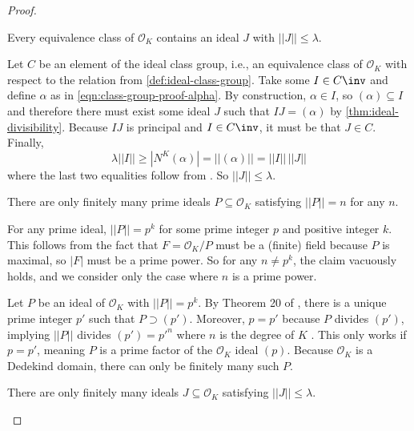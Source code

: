 \begin{proof}
    \medskip

    \begin{lemma}
        Every equivalence class of $\mathcal O_K$ contains an ideal $J$ with $||J|| \leq \lambda$.
    \end{lemma}

    Let $C$ be an element of the ideal class group, i.e., an equivalence class of $\mathcal O_K$ with respect to the relation from \autoref{def:ideal-class-group}. Take some $I \in C \inv$ and define $\alpha$ as in \autoref{eqn:class-group-proof-alpha}. By construction, $\alpha \in I$, so $(\alpha) \subseteq I$ and therefore there must exist some ideal $J$ such that $IJ = (\alpha)$ by \autoref{thm:ideal-divisibility}. Because $IJ$ is principal and $I \in C \inv$, it must be that $J \in C$. Finally,
    \begin{equation}
        \lambda ||I||
        \geq |N^K(\alpha)|
        = ||(\alpha)||
        = ||I|| \, ||J||
    \end{equation}
    where the last two equalities follow from \cite[Theorem 22]{marcus}. So $||J|| \leq \lambda$.

    \medskip

    \begin{lemma}
        There are only finitely many prime ideals $P \subseteq \mathcal O_K$ satisfying $||P|| = n$ for any $n$.
    \end{lemma}

    For any prime ideal, $||P|| = p^k$ for some prime integer $p$ and positive integer $k$. This follows from the fact that $F = \mathcal O_K / P$ must be a (finite) field because $P$ is maximal, so $|F|$ must be a prime power. So for any $n \neq p^k$, the claim vacuously holds, and we consider only the case where $n$ is a prime power.

    Let $P$ be an ideal of $\mathcal O_K$ with $||P|| = p^k$. By Theorem 20 of \textcite[45]{marcus}, there is a unique prime integer $p'$ such that $P \supset (p')$. Moreover, $p = p'$ because $P$ divides $(p')$, implying $||P||$ divides $(p') = {p'}^n$ where $n$ is the degree of $K$ \cite[Theorem 22]{marcus}. This only works if $p = p'$, meaning $P$ is a prime factor of the $\mathcal O_K$ ideal $(p)$. Because $\mathcal O_K$ is a Dedekind domain, there can only be finitely many such $P$.

    \begin{lemma}
        There are only finitely many ideals $J \subseteq \mathcal O_K$ satisfying $||J|| \leq \lambda$.
    \end{lemma}


\end{proof}

